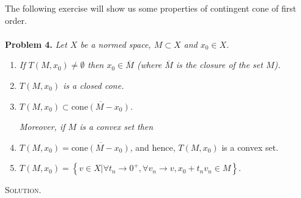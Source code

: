 \documentclass[a4paper]{article}
\numberwithin{equation}{section}
\begin{document}
The following exercise will show us some properties of contingent cone of first order.\\
\\
\textbf{Problem 4.} \textit{Let $X$ be a normed space, $M\subset X$ and $x_0 \in X$.}
\begin{enumerate}
\item \textit{If $T\left(M,x_0\right) \ne \emptyset$ then $x_0 \in \overline{M}$ (where $\overline{M}$ is the closure of the set $M$).}
\item \textit{$T\left(M,x_0\right)$ is a closed cone.}
\item \textit{$T\left( {M,{x_0}} \right) \subset \overline {\mbox{cone}\left( {M - {x_0}} \right)}$.}

\textit{Moreover, if $M$ is a convex set then}
\item $T\left( {M,{x_0}} \right) = \overline {\mbox{cone}\left( {M - {x_0}} \right)} $, and hence, $T\left(M,x_0\right)$ is a convex set.
\item $T\left( {M,{x_0}} \right) = \left\{ {v \in X|\forall {t_n} \to {0^ + },\forall {v_n} \to v,{x_0} + {t_n}{v_n} \in M} \right\}$.
\end{enumerate}
\textsc{Solution.}
\end{document}
